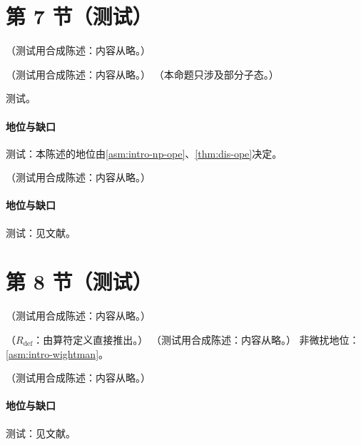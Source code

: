 \section{第 7 节（测试）}\label{sec:ee-ope}

\begin{remark}[四个逻辑层次]\label{rem:ee-status-layout}
（测试用合成陈述：内容从略。）
\end{remark}

\begin{theorem}\label{thm:ee-ope}
（测试用合成陈述：内容从略。）
（本命题只涉及部分子态。）
\end{theorem}
\begin{proofsketch}测试。\end{proofsketch}
\paragraph{地位与缺口}测试：本陈述的地位由\cref{asm:intro-np-ope}、\cref{thm:dis-ope}决定。

\begin{conjecture}\label{conj:ee-np-ope}
（测试用合成陈述：内容从略。）
\end{conjecture}
\paragraph{地位与缺口}测试：见文献。

\section{第 8 节（测试）}\label{sec:ee-duality}

\begin{remark}\label{rem:ee-complex-ope}
（测试用合成陈述：内容从略。）
\end{remark}

\begin{proposition}\label{prop:ee-smearing}
（$R_{\mathrm{def}}$：由算符定义直接推出。）
（测试用合成陈述：内容从略。）
非微扰地位：\cref{asm:intro-wightman}。
\end{proposition}

\begin{conjecture}\label{conj:ee-duality}
（测试用合成陈述：内容从略。）
\end{conjecture}
\paragraph{地位与缺口}测试：见文献。
